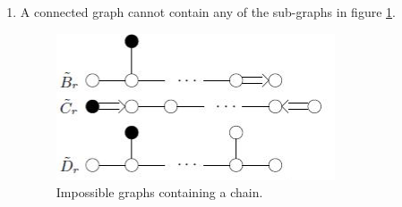 \documentclass[10pt,a4paper,twoside,openany,hidelinks]{book}
\begin{document}
\begin{enumerate}
\begin{proof}
First, $\eps$ is a unit vector.
\begin{align*}
\prs{\eps,\eps} &= \prs{\sum_{i\in[k]} \eps_i,\sum_{i\in[k]} \eps_i} \\&=
k + \sum_{i<j} 2 \prs{\eps_i, \eps_j} \\&\stackrel{\dagger}{=} k - \prs{k-1} \\&= 1
\end{align*}
with $\dagger$ being true because we assume $\prs{\eps_i}_{i\in[k]}$ is a chain which means only $\prs{\eps_j, \eps_{j+1}} \neq 0$ with $4 \prs{\eps_j, \eps_{j+1}}^2 = 1$\footnote{as there's one edge between $\eps_j, \eps_{j+1}$} and $2\prs{\eps_j, \eps_{j+1}} = -1$\footnote{since this expression is negative}.\\
Clearly, $\eps$ is linearly independent of $U \setminus \set{\eps_i}_{i\in[k]}$.\\
To show that $U'$ is an admissible system, we have to show that $4\prs{\eps,u}^2 \in \set{0,1,2,3}$ for all $u \in U \setminus \set{\eps_i}_{i\in[k]}$.\\
Consider $\prs{\eps,u} = \sum_{i \in [k]} \prs{\eps_i, u}$, we claim that at least $k-1$ of these inner products are zero. This is true because otherwise $u$ is connected to at least two elements of the chain, and one gets a (non-degenerate) cycle, contradicting a previous result. So, if $u \perp \eps_i$ for all $i \in [k]$, clearly $u \perp \eps$. If $\exists i \in [k] \colon \prs{u, \eps_i} \neq 0$, then $i$ is determined uniquely and $\prs{\eps, u} = \prs{\eps_i, u}$.
\end{proof}

\item
A connected graph cannot contain any of the sub-graphs in figure \ref{impossibe_contianing_chain}.

\begin{figure}[h!]
\centering
\caption{Impossible graphs containing a chain.}
\label{impossibe_contianing_chain}
\includegraphics[scale=0.6]{sources/chain_contradiction}
\end{figure}


\end{enumerate}
\end{document}
